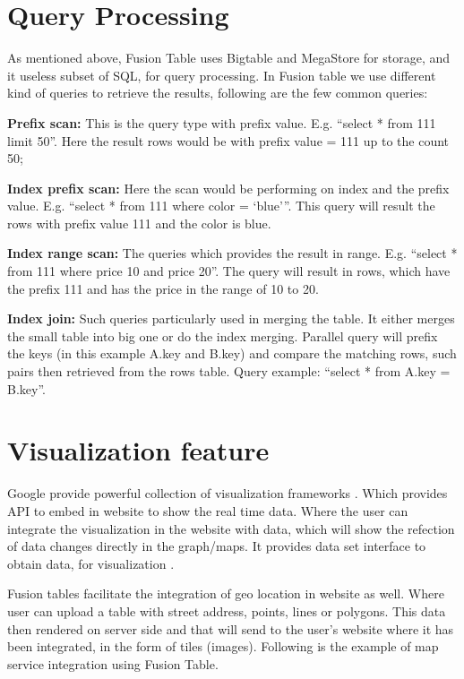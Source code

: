 \documentclass[9pt,twocolumn,twoside]{styles/osajnl}
\begin{document}
\section{Query Processing}

As mentioned above, Fusion Table uses Bigtable and MegaStore for storage, and it useless subset of SQL, for query processing. In Fusion table we use different kind of queries to retrieve the results, following are the few common queries:

\textbf{Prefix scan:} This is the query type with prefix value. E.g. “select * from 111 limit 50”.  Here the result rows would be with prefix value = 111 up to the count 50;

\textbf{Index prefix scan:} Here the scan would be performing on index and the prefix value. E.g. “select * from 111 where color = ‘blue’”. This query will result the rows with prefix value 111 and the color is blue. 

\textbf{Index range scan:} The queries which provides the result in range. E.g. “select * from 111 where price 10 and price 20”. The query will result in rows, which have the prefix 111 and has the price in the range of 10 to 20.

\textbf{Index join:} Such queries particularly used in merging the table. It either merges the small table into big one or do the index merging. Parallel query will prefix the keys (in this example A.key and B.key) and compare the matching rows, such pairs then retrieved from the rows table. Query example: “select * from A.key = B.key”.  




\section{Visualization feature}

Google provide powerful collection of visualization frameworks \cite{www-7}. Which provides API to embed in website to show the real time data. 
Where the user can integrate the visualization in the website with data, which will show the refection of data changes directly in the graph/maps. It provides data set interface to obtain data, for visualization \cite{www-7}. 


Fusion tables facilitate the integration of geo location in website as well. Where user can upload a table with street address, points, lines or polygons. This data then rendered on server side and that will send to the user’s website where it has been integrated, in the form of tiles (images). Following is the example of map service integration using Fusion Table.
\end{document}
